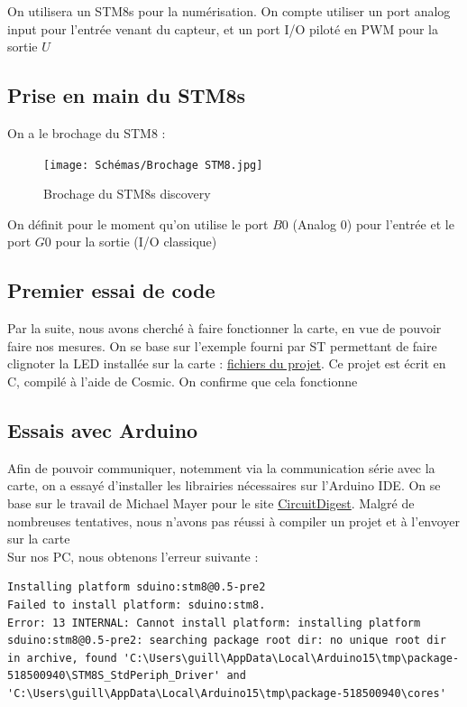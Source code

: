 \documentclass[11pt,a4paper]{article}
\begin{document}
On utilisera un STM8s pour la numérisation. On compte utiliser un port analog input pour l'entrée venant du capteur, et un port I/O piloté en PWM pour la sortie $U$

\subsection{Prise en main du STM8s}
On a le brochage du STM8 :
\begin{figure} [H]
\begin{center}
\texttt{[image: Schémas/Brochage STM8.jpg]} 
\end{center}
\caption{Brochage du STM8s discovery}
\end{figure}

On définit pour le moment qu'on utilise le port $B0$ (Analog 0) pour l'entrée et le port $G0$ pour la sortie (I/O classique)

\subsection{Premier essai de code}
Par la suite, nous avons cherché à faire fonctionner la carte, en vue de pouvoir faire nos mesures. On se base sur l'exemple fourni par ST permettant de faire clignoter la LED installée sur la carte : \href {https://www.st.com/en/embedded-software/stsw-stm8023.html}{\color{blue} fichiers du projet}. Ce projet est écrit en C, compilé à l'aide de Cosmic. On confirme que cela fonctionne

\subsection{Essais avec Arduino}
\medskip
Afin de pouvoir communiquer, notemment via la communication série avec la carte, on a essayé d'installer les librairies nécessaires sur l'Arduino IDE. On se base sur le travail de Michael Mayer pour le site \href {https://circuitdigest.com/microcontroller-projects/programming-stm8s-microcontrollers-using-arduino-ide}{\color{blue} CircuitDigest}. Malgré de nombreuses tentatives, nous n'avons pas réussi à compiler un projet et à l'envoyer sur la carte\\

Sur nos PC, nous obtenons l'erreur suivante :
\begin{lstlisting}
Installing platform sduino:stm8@0.5-pre2
Failed to install platform: sduino:stm8.
Error: 13 INTERNAL: Cannot install platform: installing platform sduino:stm8@0.5-pre2: searching package root dir: no unique root dir in archive, found 'C:\Users\guill\AppData\Local\Arduino15\tmp\package-518500940\STM8S_StdPeriph_Driver' and 'C:\Users\guill\AppData\Local\Arduino15\tmp\package-518500940\cores'
\end{lstlisting}
\end{document}
